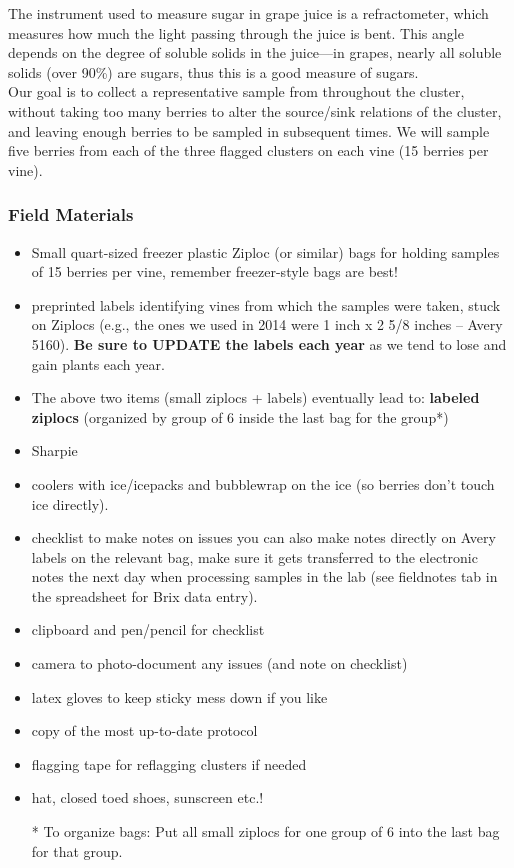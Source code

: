 \documentclass[11pt,letter]{article}
\newenvironment{smitemize}{
\begin{itemize}
  \setlength{\itemsep}{0pt}
  \setlength{\parskip}{0.8pt}
  \setlength{\parsep}{0pt}}
{\end{itemize}
}
\begin{document}
The instrument used to measure sugar in grape juice is a refractometer, which measures how much the light passing through the juice is bent. This angle depends on the degree of soluble solids in the juice---in grapes, nearly all soluble solids (over 90\%) are sugars, thus this is a good measure of sugars. \\

Our goal is to collect a representative sample from throughout the cluster, without taking too many berries to alter the source/sink relations of the cluster, and leaving enough berries to be sampled in subsequent times. We will sample five berries from each of the three flagged clusters on each vine (15 berries per vine). 

\subsubsection{Field Materials}
\begin{smitemize}
\item Small quart-sized freezer plastic Ziploc (or similar) bags for holding samples of 15 berries per vine, remember freezer-style bags are best!
\item preprinted labels identifying vines from which the samples were taken, stuck on Ziplocs (e.g., the ones we used in 2014 were 1 inch x 2 5/8 inches -- Avery 5160). {\bf Be sure to UPDATE the labels each year} as we tend to lose and gain plants each year.
\item The above two items (small ziplocs + labels) eventually lead to: {\bf labeled ziplocs} (organized by group of 6 inside the last bag for the group*)
\item Sharpie
\item coolers with ice/icepacks and bubblewrap on the ice (so berries don’t touch ice directly). 
\item checklist to make notes on issues you can also make notes directly on Avery labels on the relevant bag, make sure it gets transferred to the electronic notes the next day  when processing samples in the lab (see fieldnotes tab in the spreadsheet for Brix data entry). 
\item clipboard and pen/pencil for checklist
\item camera to photo-document any issues (and note on checklist)
\item latex gloves to keep sticky mess down if you like
\item copy of the most up-to-date protocol
\item flagging tape for reflagging clusters if needed
\item hat, closed toed shoes, sunscreen etc.!

* To organize bags: Put all small ziplocs for one group of 6 into the last bag for that group.

\end{smitemize}
\end{document}
